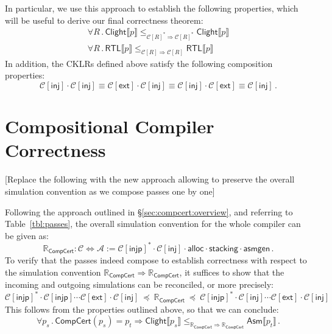 \documentclass[sigplan,10pt,review,anonymous]{acmart}
\newcommand{\kw}[1]{\ensuremath{ \mathsf{#1} }}
\begin{document}
In particular,
we use this approach to establish the following properties,
which will be useful to derive our final correctness theorem:
\begin{gather}
    \forall R \,.\,
      \kw{Clight} \llbracket p \rrbracket
        \le_{\mathcal{C}[R]^* \Rightarrow \mathcal{C}[R]^*}
      \kw{Clight} \llbracket p \rrbracket
      \label{eqn:clight}
      \\
    \forall R \,.\,
      \kw{RTL} \llbracket p \rrbracket
        \le_{\mathcal{C}[R] \Rightarrow \mathcal{C}[R]}
      \kw{RTL} \llbracket p \rrbracket
      \label{eqn:rtl}
\end{gather}
In addition,
the CKLRs defined above satisfy the following
composition properties:
\[
  \mathcal{C}[\kw{inj}] \cdot \mathcal{C}[\kw{inj}] \equiv
  \mathcal{C}[\kw{ext}] \cdot \mathcal{C}[\kw{inj}] \equiv
  \mathcal{C}[\kw{inj}] \cdot \mathcal{C}[\kw{ext}] \equiv
  \mathcal{C}[\kw{inj}] \,.
\]



\section{Compositional Compiler Correctness} %

\cbstart{}
[Replace the following with the new approach
allowing to preserve the overall simulation convention
as we compose passes one by one]
\cbend

Following the approach outlined in \S\ref{sec:compcert:overview},
and referring to Table~\ref{tbl:passes},
the overall simulation convention for the whole compiler
can be given as:
\[
  \mathbb{R}_\kw{CompCert} : \mathcal{C} \Leftrightarrow \mathcal{A} :=
    \mathcal{C}[\kw{injp}]^* \cdot
    \mathcal{C}[\kw{inj}] \cdot
    \kw{alloc} \cdot
    \kw{stacking} \cdot
    \kw{asmgen} \,.
\]
To verify that the passes indeed compose to
establish correctness with respect to the simulation convention
$\mathbb{R}_\kw{CompCert} \Rightarrow \mathbb{R}_\kw{CompCert}$,
it suffices to show that
the incoming and outgoing simulations can be reconciled,
or more precisely:
\[
    \mathcal{C}[\kw{injp}]^* \cdot
    \mathcal{C}[\kw{injp}] \cdots
    \mathcal{C}[\kw{ext}] \cdot
    \mathcal{C}[\kw{inj}]
    \: \preceq \:
    \mathbb{R}_\kw{CompCert}
    \: \preceq \:
    \mathcal{C}[\kw{injp}]^* \cdot
    \mathcal{C}[\kw{inj}] \cdots
    \mathcal{C}[\kw{ext}] \cdot
    \mathcal{C}[\kw{inj}] 
\]
This follows from the properties outlined above,
so that we can conclude:
\[
    \forall p_s \,.\,
      \kw{CompCert}(p_s) = p_t \Rightarrow
      \kw{Clight} \llbracket p_s \rrbracket
      \le_{\mathbb{R}_\kw{CompCert} \Rightarrow \mathbb{R}_\kw{CompCert}}
      \kw{Asm} \llbracket p_t \rrbracket \,.
\]
\end{document}
